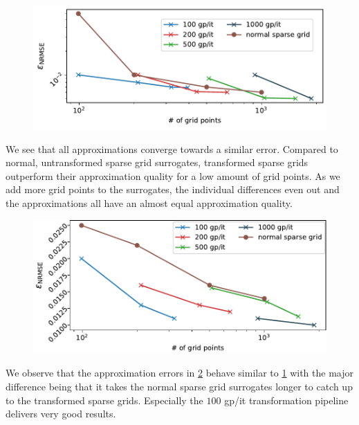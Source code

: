 \documentclass[
  a4paper,  %
  twoside,  %
  bibliography=totoc,
  headsepline,
  cleardoublepage=empty,
  parskip=half,
  draft=false
]{scrbook}
\begin{document}
\begin{mdframed}[style=style]
\begin{figure}[H]
\vspace{-1mm}\includegraphics[width=\textwidth]{graphics/cbm_compressor}\vspace{-4mm}
\delimit
{}
\label{fig:cbm_comrpessor}
\end{figure}
\end{mdframed}
%
We see that all approximations converge towards a similar error.
Compared to normal, untransformed sparse grid surrogates, transformed sparse grids outperform their approximation quality for a low amount of grid points.
As we add more grid points to the surrogates, the individual differences even out and the approximations all have an almost equal approximation quality.

\begin{mdframed}[style=style]
\begin{figure}[H]
\vspace{-1mm}\includegraphics[width=\textwidth]{graphics/cbm_turbine}\vspace{-4mm}
\delimit
{}
\label{fig:cbm_turbine}
\end{figure}
\end{mdframed}
%
We observe that the approximation errors in \cref{fig:cbm_turbine} behave similar to \cref{fig:cbm_comrpessor} with the major difference being that it takes the normal sparse grid surrogates longer to catch up to the transformed sparse grids.
Especially the $100$ gp/it transformation pipeline delivers very good results.
\end{document}
